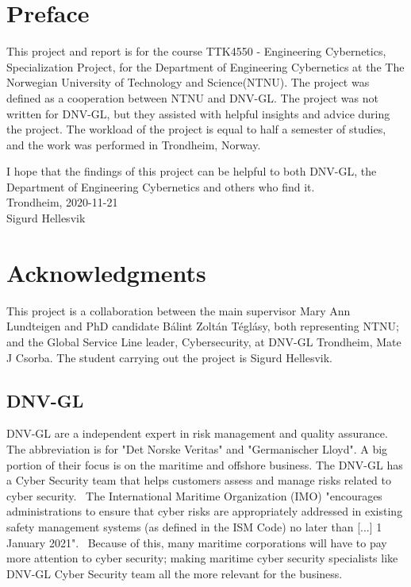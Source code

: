 \section*{Preface}
This project and report is for the course TTK4550 - Engineering Cybernetics, Specialization Project, for the Department of Engineering Cybernetics at the The Norwegian University of Technology and Science(NTNU). The project was defined as a cooperation between NTNU and DNV-GL. The project was not written for DNV-GL, but they assisted with helpful insights and advice during the project. The workload of the project is equal to half a semester of studies, and the work was performed in Trondheim, Norway.

I hope that the findings of this project can be helpful to both DNV-GL, the Department of Engineering Cybernetics and others who find it. 
\\
Trondheim, 2020-11-21
\\
Sigurd Hellesvik
\newpage

\section*{Acknowledgments} \label{sec:ack}
This project is a collaboration between the main supervisor Mary Ann Lundteigen and PhD candidate Bálint Zoltán Téglásy, both representing NTNU; and the Global Service Line leader, Cybersecurity, at DNV-GL Trondheim,  Mate J Csorba. The student carrying out the project is Sigurd Hellesvik.

\subsection*{DNV-GL}\label{sec:dnvgl}
DNV-GL are a independent expert in risk management and quality assurance. The abbreviation is for "Det Norske Veritas" and "Germanischer Lloyd". A big portion of their focus is on the maritime and offshore business. The DNV-GL has a Cyber Security team that helps customers assess and manage risks related to cyber security.~\cite{DNVGL_cybersec}  The International Maritime Organization (IMO) "encourages administrations to ensure that cyber risks are appropriately addressed in existing safety management systems (as defined in the ISM Code) no later than [...] 1 January 2021".~\cite{IMO_2021} Because of this, many maritime corporations will have to pay more attention to cyber security; making maritime cyber security specialists like DNV-GL Cyber Security team all the more relevant for the business. 

